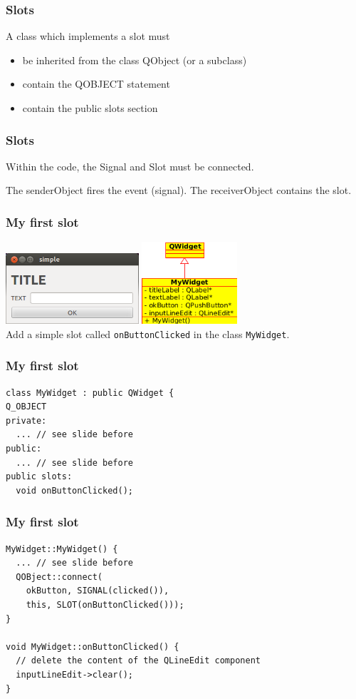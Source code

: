 \frame
{
	\frametitle{Slots}
	A class which implements a slot must
	\begin{itemize}
	\item be inherited from the class QObject (or a subclass)
	\item contain the Q\textunderscore OBJECT statement
	\item contain the public slots section
	\end{itemize}
	
}

\frame
{
	\frametitle{Slots}
	Within the code, the Signal and Slot must be connected.
	
	The senderObject fires the event (signal). The receiverObject contains the slot.
}

\begin{frame}[fragile]
	\frametitle{My first slot}
	\includegraphics[width=140pt]{img/simple.png}
	\hspace{4mm}
	\includegraphics[width=100pt]{img/simplecd.png}\\
	\vspace{3mm}
	Add a simple slot called \verb|onButtonClicked| in the class \verb|MyWidget|.
\end{frame}

\begin{frame}[fragile]
	\frametitle{My first slot}
	\begin{lstlisting}
class MyWidget : public QWidget {
Q_OBJECT
private:
  ... // see slide before
public:
  ... // see slide before
public slots:
  void onButtonClicked();
	\end{lstlisting}
\end{frame}

\begin{frame}[fragile]
	\frametitle{My first slot}
	\begin{lstlisting}
MyWidget::MyWidget() {
  ... // see slide before
  QOBject::connect(
    okButton, SIGNAL(clicked()),
    this, SLOT(onButtonClicked()));
}

void MyWidget::onButtonClicked() {
  // delete the content of the QLineEdit component
  inputLineEdit->clear();
}
	\end{lstlisting}
\end{frame}

